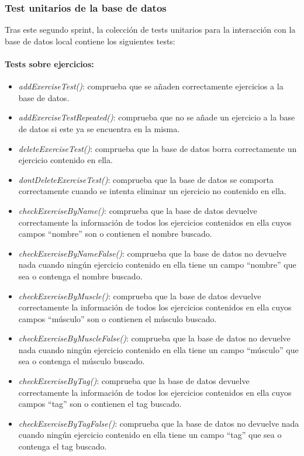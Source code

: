 \documentclass[11pt,a4paper]{report}
\begin{document}
\subsubsection{Test unitarios de la base de datos}

Tras este segundo sprint, la colección de tests unitarios para la interacción con la base de datos local contiene los siguientes tests:

\paragraph{Tests sobre ejercicios:}
\begin{itemize}
	\item \textit{addExerciseTest()}: comprueba que se añaden correctamente ejercicios a la base de datos.

	\item \textit{addExerciseTestRepeated()}: comprueba que no se añade un ejercicio a la base de datos si este ya se encuentra en la misma.

	\item \textit{deleteExerciseTest()}: comprueba que la base de datos borra correctamente un ejercicio contenido en ella.

	\item \textit{dontDeleteExerciseTest()}: comprueba que la base de datos se comporta correctamente cuando se intenta eliminar un ejercicio no contenido en ella.

	\item \textit{checkExerciseByName()}: comprueba que la base de datos devuelve correctamente la información de todos los ejercicios contenidos en ella cuyos campos “nombre” son o contienen el nombre buscado.

	\item \textit{checkExerciseByNameFalse()}: comprueba que la base de datos no devuelve nada cuando ningún ejercicio contenido en ella tiene un campo “nombre” que sea o contenga el nombre buscado.

	\item \textit{checkExerciseByMuscle()}: comprueba que la base de datos devuelve correctamente la información de todos los ejercicios contenidos en ella cuyos campos “músculo” son o contienen el músculo buscado.

	\item \textit{checkExerciseByMuscleFalse()}: comprueba que la base de datos no devuelve nada cuando ningún ejercicio contenido en ella tiene un campo “músculo” que sea o contenga el músculo buscado.

	\item \textit{checkExerciseByTag()}: comprueba que la base de datos devuelve correctamente la información de todos los ejercicios contenidos en ella cuyos campos “tag” son o contienen el tag buscado.

	\item \textit{checkExerciseByTagFalse()}: comprueba que la base de datos no devuelve nada cuando ningún ejercicio contenido en ella tiene un campo “tag” que sea o contenga el tag buscado.

\end{itemize}
\end{document}
